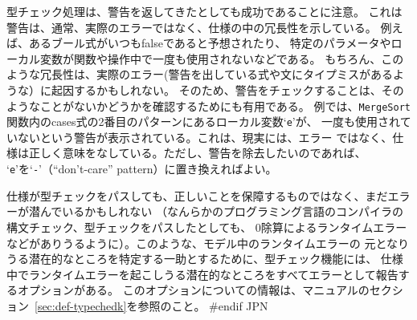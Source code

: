 \documentclass[\pformat,12pt]{article}
\def\vdmpp{{\small VDM}++}
\newcommand{\vdmslpp}{VDM-SL}
\newcommand{\Toolbox}{Toolbox}
\newcommand{\vdmslpp}{VDM++}
\newcommand{\Toolbox}{Toolbox}
\renewcommand{\vdmslpp}{VDM++ VICE}
\newcommand{\guicmd}[1]{{\sf #1}}
\newcommand{\guicmd}[1]{{\gt #1}}
\begin{document}
型チェック処理は、警告を返してきたとしても成功であることに注意。
これは警告は、通常、実際のエラーではなく、仕様の中の冗長性を示している。
例えば、あるブール式がいつもfalseであると予想されたり、
特定のパラメータやローカル変数が関数や操作中で一度も使用されないなどである。
もちろん、このような冗長性は、実際のエラー(警告を出している式や文にタイプミスがあるような）に起因するかもしれない。
そのため、警告をチェックすることは、そのようなことがないかどうかを確認するためにも有用である。
例では、{\tt MergeSort} 関数内のcases式の2番目のパターンにあるローカル変数`{\tt e}'が、
一度も使用されていないという警告が表示されている。これは、現実には、エラー
ではなく、仕様は正しく意味をなしている。ただし、警告を除去したいのであれば、
`{\tt e}'を`{\tt -}'（“don't-care” pattern）に置き換えればよい。

仕様が型チェックをパスしても、正しいことを保障するものではなく、まだエラーが潜んでいるかもしれない
（なんらかのプログラミング言語のコンパイラの構文チェック、型チェックをパスしたとしても、
0除算によるランタイムエラーなどがありうるように）。このような、モデル中のランタイムエラーの
元となりうる潜在的なところを特定する一助とするために、型チェック機能には、
仕様中でランタイムエラーを起こしうる潜在的なところをすべてエラーとして報告するオプションがある。
このオプションについての情報は、マニュアルのセクション~\ref{sec:def-typechedk}を参照のこと。
#endif JPN


% 
%


\end{document}
